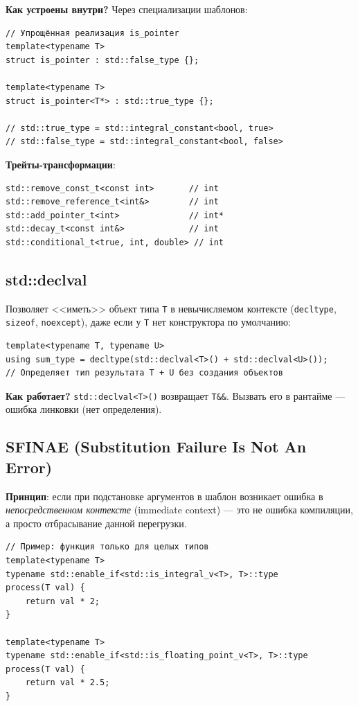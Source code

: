 \documentclass[12pt,a4paper]{article}
\begin{document}
\textbf{Как устроены внутри?} Через специализации шаблонов:
\begin{lstlisting}
// Упрощённая реализация is_pointer
template<typename T>
struct is_pointer : std::false_type {};

template<typename T>
struct is_pointer<T*> : std::true_type {};

// std::true_type = std::integral_constant<bool, true>
// std::false_type = std::integral_constant<bool, false>
\end{lstlisting}

\textbf{Трейты-трансформации}:
\begin{lstlisting}
std::remove_const_t<const int>       // int
std::remove_reference_t<int&>        // int
std::add_pointer_t<int>              // int*
std::decay_t<const int&>             // int
std::conditional_t<true, int, double> // int
\end{lstlisting}

\subsection{std::declval}

Позволяет <<иметь>> объект типа \texttt{T} в невычисляемом контексте (\texttt{decltype}, \texttt{sizeof}, \texttt{noexcept}), даже если у \texttt{T} нет конструктора по умолчанию:

\begin{lstlisting}
template<typename T, typename U>
using sum_type = decltype(std::declval<T>() + std::declval<U>());
// Определяет тип результата T + U без создания объектов
\end{lstlisting}

\textbf{Как работает?} \texttt{std::declval<T>()} возвращает \texttt{T\&\&}. Вызвать его в рантайме --- ошибка линковки (нет определения).

\subsection{SFINAE (Substitution Failure Is Not An Error)}

\textbf{Принцип}: если при подстановке аргументов в шаблон возникает ошибка в \textit{непосредственном контексте} (immediate context) --- это не ошибка компиляции, а просто отбрасывание данной перегрузки.

\begin{lstlisting}
// Пример: функция только для целых типов
template<typename T>
typename std::enable_if<std::is_integral_v<T>, T>::type
process(T val) {
    return val * 2;
}

template<typename T>
typename std::enable_if<std::is_floating_point_v<T>, T>::type
process(T val) {
    return val * 2.5;
}
\end{lstlisting}
\end{document}
